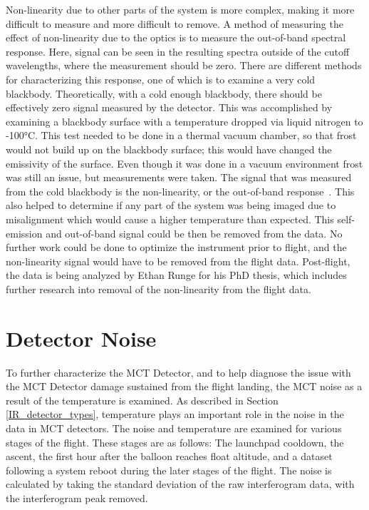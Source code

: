Non-linearity due to other parts of the system is more complex, making it more difficult to measure and more difficult to remove. A method of measuring the effect of non-linearity due to the optics is to measure the out-of-band spectral response. Here, signal can be seen in the resulting spectra outside of the cutoff wavelengths, where the measurement should be zero. There are different methods for characterizing this response, one of which is to examine a very cold blackbody. Theoretically, with a cold enough blackbody, there should be effectively zero signal measured by the detector. This was accomplished by examining a blackbody surface with a temperature dropped via liquid nitrogen to -100°C. This test needed to be done in a thermal vacuum chamber, so that frost would not build up on the blackbody surface; this would have changed the emissivity of the surface. Even though it was done in a vacuum environment frost was still an issue, but measurements were taken. The signal that was measured from the cold blackbody is the non-linearity, or the out-of-band response~\citep{non-linearity_correction}. This also helped to determine if any part of the system was being imaged due to misalignment which would cause a higher temperature than expected. This self-emission and out-of-band signal could be then be removed from the data. No further work could be done to optimize the instrument prior to flight, and the non-linearity signal would have to be removed from the flight data. Post-flight, the data is being analyzed by Ethan Runge for his PhD thesis, which includes further research into removal of the non-linearity from the flight data.

\section{Detector Noise}\label{detector_noise_flight}
To further characterize the MCT Detector, and to help diagnose the issue with the MCT Detector damage sustained from the flight landing, the MCT noise as a result of the temperature is examined. As described in Section \ref{IR_detector_types}, temperature plays an important role in the noise in the data in MCT detectors. The noise and temperature are examined for various stages of the flight. These stages are as follows: The launchpad cooldown, the ascent, the first hour after the balloon reaches float altitude, and a dataset following a system reboot during the later stages of the flight. The noise is calculated by taking the standard deviation of the raw interferogram data, with the interferogram peak removed.


